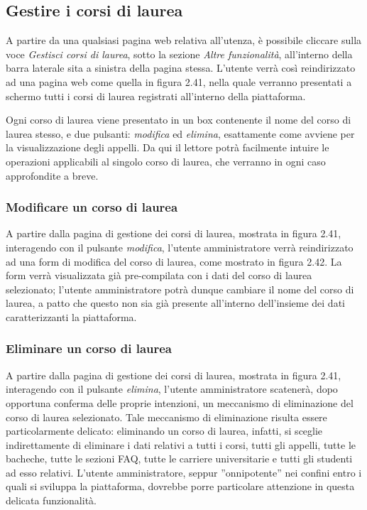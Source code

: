 \documentclass [a4paper,11pt]{book}
\begin{document}

\medskip

\subsection{Gestire i corsi di laurea}

A partire da una qualsiasi pagina web relativa all'utenza, è possibile cliccare sulla voce \emph{Gestisci corsi di laurea}, sotto la sezione \emph{Altre funzionalità}, all'interno della barra laterale sita a sinistra della pagina stessa. L'utente verrà così reindirizzato ad una pagina web come quella in figura 2.41, nella quale verranno presentati a schermo tutti i corsi di laurea registrati all'interno della piattaforma.


Ogni corso di laurea viene presentato in un box contenente il nome del corso di laurea stesso, e due pulsanti: \emph{modifica} ed \emph{elimina}, esattamente come avviene per la visualizzazione degli appelli. Da qui il lettore potrà facilmente intuire le operazioni applicabili al singolo corso di laurea, che verranno in ogni caso approfondite a breve.

\medskip 

\subsubsection{Modificare un corso di laurea}

A partire dalla pagina di gestione dei corsi di laurea, mostrata in figura 2.41, interagendo con il pulsante \emph{modifica}, l'utente amministratore verrà reindirizzato ad una form di modifica del corso di laurea, come mostrato in figura 2.42. La form verrà visualizzata già pre-compilata con i dati del corso di laurea selezionato; l'utente amministratore potrà dunque cambiare il nome del corso di laurea, a patto che questo non sia già presente all'interno dell'insieme dei dati caratterizzanti la piattaforma.


\medskip

\subsubsection{Eliminare un corso di laurea}

A partire dalla pagina di gestione dei corsi di laurea, mostrata in figura 2.41, interagendo con il pulsante \emph{elimina}, l'utente amministratore scatenerà, dopo opportuna conferma delle proprie intenzioni, un meccanismo di eliminazione del corso di laurea selezionato. Tale meccanismo di eliminazione risulta essere particolarmente delicato: eliminando un corso di laurea, infatti, si sceglie indirettamente di eliminare i dati relativi a tutti i corsi, tutti gli appelli, tutte le bacheche, tutte le sezioni FAQ, tutte le carriere universitarie e tutti gli studenti ad esso relativi. L'utente amministratore, seppur ''onnipotente'' nei confini entro i quali si sviluppa la piattaforma, dovrebbe porre particolare attenzione in questa delicata funzionalità.
\end{document}
